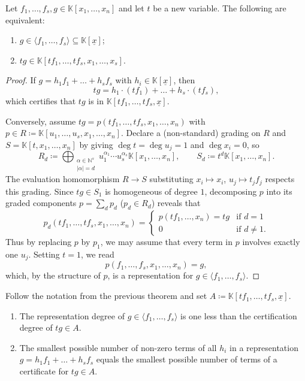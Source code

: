 \documentclass[12pt]{article}
\newcommand{\NN}{\mathbb{N}}
\newcommand{\KK}{\mathbb{K}}
\newcommand{\x}{{\underline x}}
\begin{document}
\begin{theorem}\label{thm:ideal_to_algebra}
Let $f_1,\dots,f_s,g \in \KK[x_1,\dots,x_n]$ and let $t$ be a new variable. The following are equivalent:
\begin{enumerate}[label=\textup{(\alph*)}]
\item $g \in \langle f_1,\dots,f_s\rangle \subseteq \KK[\x]$;
\item $tg \in \KK[tf_1,\dots,tf_s,x_1,\dots,x_s]$.
\end{enumerate}
\end{theorem}
\begin{proof}
If $g = h_1f_1+\dots+h_sf_s$ with $h_i \in \KK[\x]$, then
\[
tg = h_1\cdot (tf_1)+\dots+h_s\cdot (tf_s),
\]
which certifies that $tg$ is in $\KK[tf_1,\dots,tf_s,\x]$.

Conversely, assume $tg = p(tf_1,\dots,tf_s,x_1,\dots,x_n)$ with $p \in R \coloneqq \KK[u_1,\dots,u_s,x_1,\dots,x_n]$. Declare a (non-standard) grading on $R$ and $S=\KK[t,x_1,\dots,x_n]$ by giving $\deg t = \deg u_j = 1$ and $\deg x_i = 0$, so
\[
R_d \coloneqq \bigoplus_{\substack{\alpha \in \NN^s\\ |\alpha|=d}} u_1^{\alpha_1}\dotsm u_s^{\alpha_s}\KK[x_1,\dots,x_n], \qquad S_d \coloneqq t^d\KK[x_1,\dots,x_n].
\]
The evaluation homomorphism $R\to S$ substituting $x_i \mapsto x_i$, $u_j \mapsto t_jf_j$ respects this grading. Since $tg \in S_1$ is homogeneous of degree $1$, decomposing $p$ into its graded components $p=\sum_d p_d$ ($p_d \in R_d$) reveals that
\[
p_d(tf_1,\dots,tf_s,x_1,\dots,x_n) = \begin{cases}
p(tf_1,\dots,x_n) = tg & \text{if }d=1 \\
0 & \text{if }d\neq 1.
\end{cases}
\]
Thus by replacing $p$ by $p_1$, we may assume that every term in $p$ involves exactly one $u_j$. Setting $t=1$, we read
\[
p(f_1,\dots,f_s,x_1,\dots,x_n) = g,
\]
which, by the structure of $p$, is a representation for $g \in \langle f_1,\dots,f_s\rangle$.
\end{proof}
\begin{corollary}\label{cor:repdeg_to_certdeg}
Follow the notation from the previous theorem and set $A \coloneqq \KK[tf_1,\dots,tf_s,\x]$.
\begin{enumerate}
\item The representation degree of $g \in \langle f_1,\dots,f_s\rangle$ is one less than the certification degree of $tg \in A$.
\item The smallest possible number of non-zero terms of all $h_i$ in a representation $g = h_1f_1+\dots+h_sf_s$ equals the smallest possible number of terms of a certificate for $tg \in A$. 
\end{enumerate}
\end{corollary}
\end{document}
